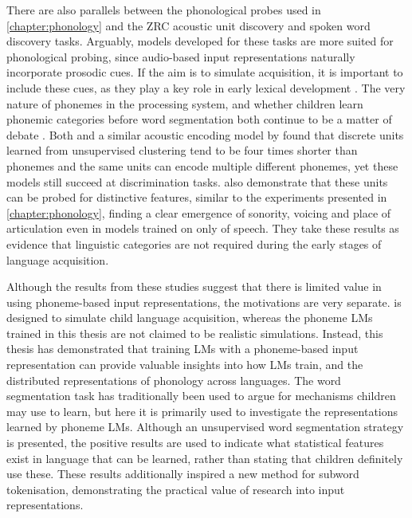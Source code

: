 There are also parallels between the phonological probes used in \cref{chapter:phonology} and the ZRC acoustic unit discovery and spoken word discovery tasks. Arguably, models developed for these tasks are more suited for phonological probing, since audio-based input representations naturally incorporate prosodic cues. If the aim is to simulate acquisition, it is important to include these cues, as they play a key role in early lexical development \citep{Cutler1987, Jusczyk1993stress, jusczyk-1999-stress-voice}. The very nature of phonemes in the processing system, and whether children learn phonemic categories before word segmentation both continue to be a matter of debate \citep{kazanina2018phonemes, matusevych2023infant}. Both \stela and a similar acoustic encoding model by \citet{schatz2021early} found that discrete units learned from unsupervised clustering tend to be four times shorter than phonemes and the same units can encode multiple different phonemes, yet these models still succeed at discrimination tasks. \citet{lavechin2025simulating} also demonstrate that these units can be probed for distinctive features, similar to the experiments presented in \cref{chapter:phonology}, finding a clear emergence of sonority, voicing and place of articulation even in models trained on only  of speech. They take these results as evidence that linguistic categories are not required during the early stages of language acquisition.

Although the results from these studies suggest that there is limited value in using phoneme-based input representations, the motivations are very separate. \stela is designed to simulate child language acquisition, whereas the phoneme LMs trained in this thesis are not claimed to be realistic simulations. Instead, this thesis has demonstrated that training LMs with a phoneme-based input representation can provide valuable insights into how LMs train, and the distributed representations of phonology across languages. The word segmentation task has traditionally been used to argue for mechanisms children may use to learn, but here it is primarily used to investigate the representations learned by phoneme LMs. Although an unsupervised word segmentation strategy is presented, the positive results are used to indicate what statistical features exist in language that can be learned, rather than stating that children definitely use these. These results additionally inspired a new method for subword tokenisation, demonstrating the practical value of research into input representations.

